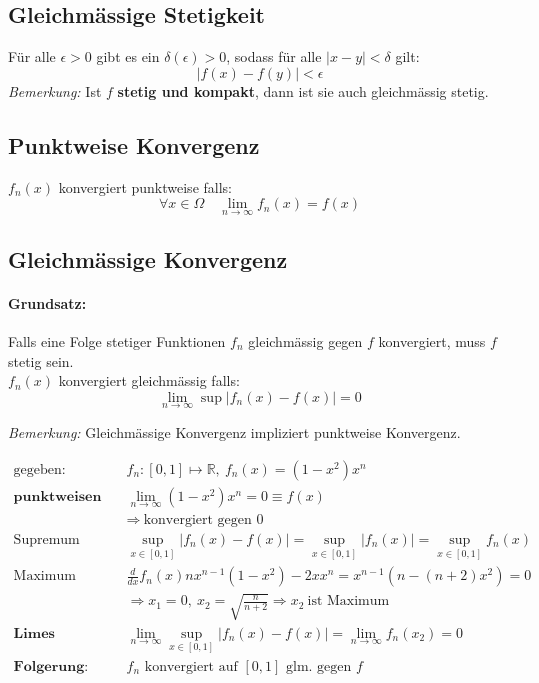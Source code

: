 \documentclass[11pt]{article}
\begin{document}
\subsection{Gleichm{\"a}ssige Stetigkeit}
F{\"u}r alle $\epsilon > 0$ gibt es ein $\delta(\epsilon) >0$, sodass f{\"u}r alle $|x-y|<\delta$ gilt:
\begin{equation*}
	|f(x)-f(y)| < \epsilon
\end{equation*}
\emph{Bemerkung:} Ist $f$ \textbf{stetig und kompakt}, dann ist sie auch gleichm{\"a}ssig stetig.

\subsection{Punktweise Konvergenz}

$f_n(x)$ konvergiert punktweise falls:
\begin{equation*}
	\forall x\in \Omega \quad \lim_{n\rightarrow\infty}f_n(x) = f(x)
\end{equation*}

\subsection{Gleichm{\"a}ssige Konvergenz}

\paragraph{Grundsatz:} Falls eine Folge stetiger Funktionen $f_n$ gleichm{\"a}ssig gegen $f$ konvergiert, muss $f$ stetig sein.\\

$f_n(x)$ konvergiert gleichm{\"a}ssig falls:
\begin{equation*}
	\lim_{n\rightarrow\infty} \sup|f_n(x) - f(x)| = 0
\end{equation*}

\emph{Bemerkung:} Gleichm{\"a}ssige Konvergenz impliziert punktweise Konvergenz.

\begin{equation*}
\begin{split}
	\text{gegeben:} \quad & f_n:[0,1] \mapsto \mathbb{R},\ f_n(x) = (1 - x^2)x^n \\
	\textbf{punktweisen Limes berechnen:} \quad & \lim_{n \to \infty} (1 - x^2)x^n = 0 \equiv f(x) \\
	& \Rightarrow\ \text{konvergiert gegen 0} \\
	\text{Supremum berechnen:} \quad & \sup_{x \in [0,1]} |f_n(x) -f(x)| = \sup_{x \in [0,1]} |f_n(x)| = \sup_{x \in [0,1]}f_n(x) \\
	\text{Maximum finden:} \quad & \frac{d}{dx} f_n(x) nx^{n-1}(1-x^2)-2xx^n = x^{n-1}(n - (n+2)x^2) = 0 \\
	& \Rightarrow x_1 = 0,\ x_2 = \sqrt{\frac{n}{n+2}} \Rightarrow x_2\ \text{ist Maximum} \\
	\textbf{Limes berechnen:} \quad & \lim_{n \to \infty} \sup_{x \in [0,1]} |f_n(x) - f(x)| = \lim_{n \to \infty} f_n(x_2) = 0 \\
	\textbf{Folgerung:} \quad & \text{$f_n$ konvergiert auf $[0,1]$ glm. gegen $f$}
\end{split}
\end{equation*}
\end{document}
